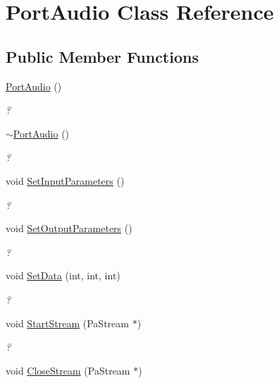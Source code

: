 \hypertarget{class_port_audio}{}\section{Port\+Audio Class Reference}
\label{class_port_audio}
\subsection*{Public Member Functions}
\begin{DoxyCompactItemize}
\item 
\hyperlink{class_port_audio_ad5640eccbb52a46880bf424f26d1809f}{Port\+Audio} ()
\begin{DoxyCompactList}\small\item\em ? \end{DoxyCompactList}\item 
\hyperlink{class_port_audio_a5f80fdff2377981fcd42fae42d4b65c3}{$\sim$\+Port\+Audio} ()
\begin{DoxyCompactList}\small\item\em ? \end{DoxyCompactList}\item 
void \hyperlink{class_port_audio_aba9d07307c1d1da76f60b34c36e7b307}{Set\+Input\+Parameters} ()
\begin{DoxyCompactList}\small\item\em ? \end{DoxyCompactList}\item 
void \hyperlink{class_port_audio_ab6c65dcf34b99509ef98eb6025f3f2c9}{Set\+Output\+Parameters} ()
\begin{DoxyCompactList}\small\item\em ? \end{DoxyCompactList}\item 
void \hyperlink{class_port_audio_adbe0192928bae24d0d469b39561b9859}{Set\+Data} (int, int, int)
\begin{DoxyCompactList}\small\item\em ? \end{DoxyCompactList}\item 
void \hyperlink{class_port_audio_a0da7ed31a1a6e38800c4f4e2e179565f}{Start\+Stream} (Pa\+Stream $\ast$)
\begin{DoxyCompactList}\small\item\em ? \end{DoxyCompactList}\item 
void \hyperlink{class_port_audio_acb0f54f9382bc8da31d2a39bcf88bb36}{Close\+Stream} (Pa\+Stream $\ast$)

\end{DoxyCompactItemize}
